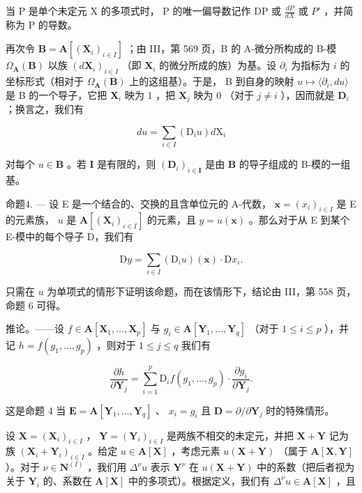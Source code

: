 当 P 是单个未定元 X 的多项式时， P 的唯一偏导数记作 DP 或 \(\frac{dP}{dX}\) 或 \(P'\) ，并简称为 P 的导数。

再次令 \(\mathbf{B} = \mathbf{A}\left[(\mathbf{X}_i)_{i\in I}\right]\) ；由 III，第 569 页，B 的 A-微分所构成的 B-模 \(\Omega_{\mathbf{A}}(\mathbf{B})\) 以族 \((d\mathbf{X}_i)_{i\in I}\) （即 \(\mathbf{X}_i\) 的微分所成的族）为基。设 \(\partial_i\) 为指标为 \(i\) 的坐标形式（相对于 \(\Omega_{\mathbf{A}}(\mathbf{B})\) 上的这组基）。于是， B 到自身的映射 \(u\mapsto \langle \partial_i,du\rangle\) 是 B 的一个导子，它把 \(\mathbf{X}_i\) 映为 1 ，把 \(\mathbf{X}_j\) 映为 0 （对于 \(j\neq i\) ），因而就是 \(\mathbf{D}_i\) ；换言之，我们有

\[
d u = \sum_ {i \in I} \left(\mathrm{D} _ {i} u\right) d \mathrm{X} _ {i}\tag{7}
\]

对每个 \(u \in \mathbf{B}\) 。若 \(\mathbf{I}\) 是有限的，则 \((\mathbf{D}_i)_{i \in \mathbf{I}}\) 是由 \(\mathbf{B}\) 的导子组成的 B-模的一组基。

命题4. --- 设 E 是一个结合的、交换的且含单位元的 A-代数， \(\mathbf{x} = (x_i)_{i\in I}\) 是 E 的元素族， \(u\) 是 \(\mathbf{A}[(\mathbf{X}_i)_{i\in I}]\) 的元素，且 \(y = u(\mathbf{x})\) 。那么对于从 E 到某个 E-模中的每个导子 D，我们有

\[
\mathrm{D} y = \sum_ {i \in I} \left(\mathrm{D} _ {i} u\right) (\mathbf {x}) \cdot \mathrm{D} x _ {i}.
\]

只需在 \(u\) 为单项式的情形下证明该命题，而在该情形下，结论由 III，第 558 页，命题 6 可得。

推论。——设 \(f \in \mathbf{A}[\mathbf{X}_1, \ldots, \mathbf{X}_p]\) 与 \(g_i \in \mathbf{A}[\mathbf{Y}_1, \ldots, \mathbf{Y}_q]\) （对于 \(1 \leqslant i \leqslant p\) ），并记 \(h = f(g_1, \ldots, g_p)\) ，则对于 \(1 \leqslant j \leqslant q\) 我们有

\[
\frac {\partial h}{\partial \mathbf {Y} _ {j}} = \sum_ {i = 1} ^ {p} \mathrm{D} _ {i} f (g _ {1}, \dots , g _ {p}) \cdot \frac {\partial g _ {i}}{\partial \mathbf {Y} _ {j}}.\tag{8}
\]

这是命题 4 当 \(\mathbf{E} = \mathbf{A}[\mathbf{Y}_1,\dots ,\mathbf{Y}_q]\) 、 \(x_{i} = g_{i}\) 且 \(\mathbf{D} = \partial /\partial \mathbf{Y}_j\) 时的特殊情形。

设 \(\mathbf{X} = (\mathbf{X}_i)_{i\in I}\) ， \(\mathbf{Y} = (\mathbf{Y}_i)_{i\in I}\) 是两族不相交的未定元，并把 \(\mathbf{X} + \mathbf{Y}\) 记为族 \((\mathbf{X}_i + \mathbf{Y}_i)_{i\in I}\) 。给定 \(u\in \mathbf{A}[\mathbf{X}]\) ，考虑元素 \(u(\mathbf{X} + \mathbf{Y})\) （属于 \(\mathbf{A}[\mathbf{X},\mathbf{Y}]\) ）。对于 \(\nu \in \mathbf{N}^{(I)}\) ，我们用 \(\Delta^{\nu}u\) 表示 \(\mathbf{Y}^{\nu}\) 在 \(u(\mathbf{X} + \mathbf{Y})\) 中的系数（把后者视为关于 \(\mathbf{Y}_i\) 的、系数在 \(\mathbf{A}[\mathbf{X}]\) 中的多项式）。根据定义，我们有 \(\Delta^{\nu}u\in \mathbf{A}[\mathbf{X}]\) ，且

